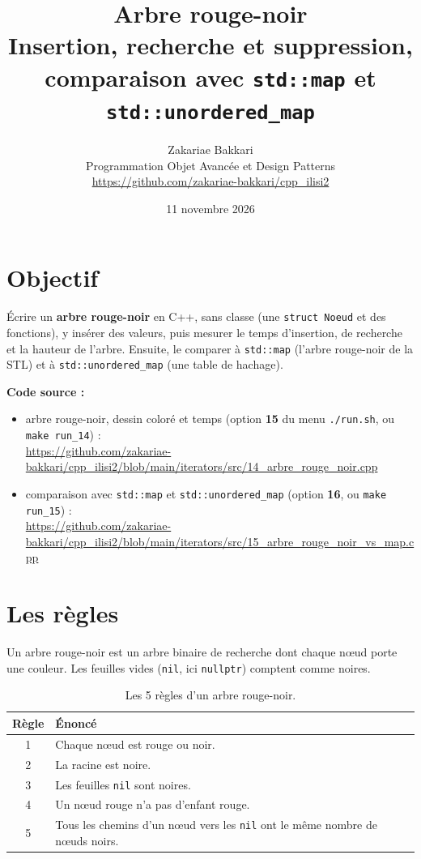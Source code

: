 \documentclass[11pt,a4paper]{article}
\title{\textbf{Arbre rouge-noir}\\[4pt]
       \large Insertion, recherche et suppression, comparaison avec \texttt{std::map}
       et \texttt{std::unordered\_map}}
\author{Zakariae Bakkari\\
        \small Programmation Objet Avancée et Design Patterns\\
        \small\url{https://github.com/zakariae-bakkari/cpp_ilisi2}}
\date{11 novembre 2026}
\begin{document}
\maketitle

\section{Objectif}

Écrire un \textbf{arbre rouge-noir} en C++, sans classe (une \texttt{struct Noeud} et des
fonctions), y insérer des valeurs, puis mesurer le temps d'insertion, de recherche et la
hauteur de l'arbre. Ensuite, le comparer à \texttt{std::map} (l'arbre rouge-noir de la STL)
et à \texttt{std::unordered\_map} (une table de hachage).

\textbf{Code source :}
\begin{itemize}\footnotesize\sloppy
  \item arbre rouge-noir, dessin coloré et temps (option \textbf{15} du menu
        \texttt{./run.sh}, ou \texttt{make run\_14}) :\\
        \url{https://github.com/zakariae-bakkari/cpp_ilisi2/blob/main/iterators/src/14_arbre_rouge_noir.cpp}
  \item comparaison avec \texttt{std::map} et \texttt{std::unordered\_map} (option
        \textbf{16}, ou \texttt{make run\_15}) :\\
        \url{https://github.com/zakariae-bakkari/cpp_ilisi2/blob/main/iterators/src/15_arbre_rouge_noir_vs_map.cpp}
\end{itemize}

\section{Les règles}

Un arbre rouge-noir est un arbre binaire de recherche dont chaque nœud porte une couleur.
Les feuilles vides (\texttt{nil}, ici \texttt{nullptr}) comptent comme noires.

\begin{table}[H]
\centering
\begin{tabular}{|c|l|}
\hline
\textbf{Règle} & \textbf{Énoncé} \\
\hline
1 & Chaque nœud est rouge ou noir. \\
\hline
2 & La racine est noire. \\
\hline
3 & Les feuilles \texttt{nil} sont noires. \\
\hline
4 & Un nœud rouge n'a pas d'enfant rouge. \\
\hline
5 & Tous les chemins d'un nœud vers les \texttt{nil} ont le même nombre de nœuds noirs. \\
\hline
\end{tabular}
\caption{Les 5 règles d'un arbre rouge-noir.}
\end{table}
\end{document}
